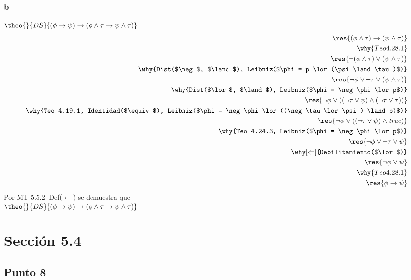 \documentclass[twoside]{article}
\begin{document}
\subsubsection{b}
\begin{logicenv}[2]{$\theo{}{DS}{(\phi \to \psi) \to (\phi \land \tau \to \psi \land \tau)}$}
    \begin{align*}
            \res{(\phi \land \tau) \to (\psi \land \tau)}\\
        \why{Teo 4.28.1}\\
            \res{\neg(\phi \land \tau) \lor (\psi \land \tau)}\\
        \why{Dist($\neg$, $\land$), Leibniz($\phi = p \lor (\psi \land \tau)$)}\\
            \res{\neg\phi \lor \neg\tau \lor (\psi \land \tau)}\\
        \why{Dist($\lor$, $\land$), Leibniz($\phi = \neg\phi \lor p$)}\\
            \res{\neg\phi \lor ((\neg\tau \lor \psi) \land (\neg\tau \lor \tau))}\\
        \why{Teo 4.19.1, Identidad($\equiv$), Leibniz($\phi = \neg\phi \lor ((\neg\tau \lor \psi) \land p)$)}\\
            \res{\neg\phi \lor ((\neg\tau \lor \psi) \land \text{\textit{true}})}\\
        \why{Teo 4.24.3, Leibniz($\phi = \neg\phi \lor p$)}\\
            \res{\neg\phi \lor \neg\tau \lor \psi}\\
        \why[\Leftarrow]{Debilitamiento($\lor$)}\\
            \res{\neg\phi \lor \psi}\\
        \why{Teo 4.28.1}\\
            \res{\phi \to \psi}
    \end{align*}
    Por MT 5.5.2, Def($\gets$) se demuestra que\\
    $\theo{}{DS}{(\phi \to \psi) \to (\phi \land \tau \to \psi \land \tau)}$
\end{logicenv}


\section{Sección 5.4}
\subsection{Punto 8}
\end{document}
